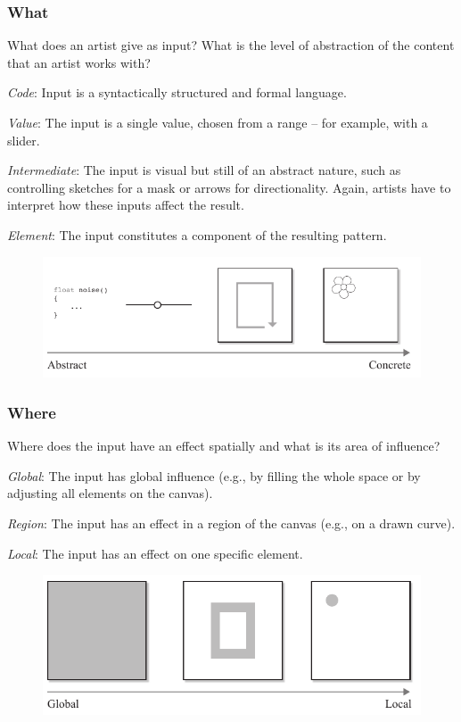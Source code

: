 \subsubsection{What}

What does an artist give as input? What is the level of abstraction of the content that an artist works with?

\textit{Code}: Input is a syntactically structured and formal language.

\textit{Value}: The input is a single value, chosen from a range – for example, with a slider.

\textit{Intermediate}: The input is visual but still of an abstract nature, such as controlling sketches for a mask or arrows for directionality. Again, artists have to interpret how these inputs affect the result.

\textit{Element}: The input constitutes a component of the resulting pattern.

\begin{figure}[H]
    \centering
        \includegraphics[width=\controlParamsFigWidth\linewidth]{figures/control_paradigms/what.pdf}
\end{figure}



\subsubsection{Where}

Where does the input have an effect spatially and what is its area of influence?

\textit{Global}: The input has global influence (e.g., by filling the whole space or by adjusting all elements on the canvas).

\textit{Region}: The input has an effect in a region of the canvas (e.g., on a drawn curve).

\textit{Local}: The input has an effect on one specific element.

\begin{figure}[H]
    \centering
        \includegraphics[width=\controlParamsFigWidth\linewidth]{figures/control_paradigms/where.pdf}
\end{figure}


